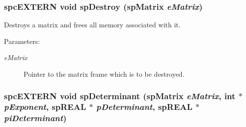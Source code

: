 \subsubsection{\setlength{\rightskip}{0pt plus 5cm}spc\-EXTERN void sp\-Destroy ({\bf sp\-Matrix} {\em e\-Matrix})}\label{spMatrix_8h_a26}


Destroys a matrix and frees all memory associated with it.\begin{Desc}
\item[Parameters: ]\par
\begin{description}
\item[{\em 
e\-Matrix}]Pointer to the matrix frame which is to be destroyed. \end{description}
\end{Desc}
\subsubsection{\setlength{\rightskip}{0pt plus 5cm}spc\-EXTERN void sp\-Determinant ({\bf sp\-Matrix} {\em e\-Matrix}, int $\ast$ {\em p\-Exponent}, sp\-REAL $\ast$ {\em p\-Determinant}, sp\-REAL $\ast$ {\em pi\-Determinant})}\label{spMatrix_8h_a56}


